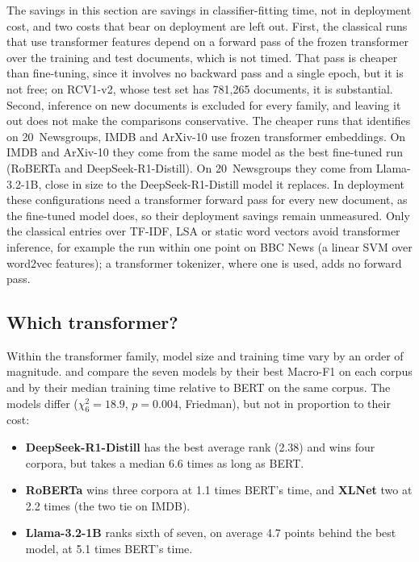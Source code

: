 \documentclass{ijis}
\begin{document}
The savings in this section are savings in classifier-fitting time, not in deployment cost, and two costs that bear on deployment are left out. First, the classical runs that use transformer features depend on a forward pass of the frozen transformer over the training and test documents, which is not timed. That pass is cheaper than fine-tuning, since it involves no backward pass and a single epoch, but it is not free; on RCV1-v2, whose test set has 781,265 documents, it is substantial. Second, inference on new documents is excluded for every family, and leaving it out does not make the comparisons conservative. The cheaper runs that  identifies on 20~Newsgroups, IMDB and ArXiv-10 use frozen transformer embeddings. On IMDB and ArXiv-10 they come from the same model as the best fine-tuned run (RoBERTa and DeepSeek-R1-Distill). On 20~Newsgroups they come from Llama-3.2-1B, close in size to the DeepSeek-R1-Distill model it replaces. In deployment these configurations need a transformer forward pass for every new document, as the fine-tuned model does, so their deployment savings remain unmeasured. Only the classical entries over TF-IDF, LSA or static word vectors avoid transformer inference, for example the run within one point on BBC News (a linear SVM over word2vec features); a transformer tokenizer, where one is used, adds no forward pass.

\subsection{Which transformer?}\label{sec:lms}

Within the transformer family, model size and training time vary by an order of magnitude.  and  compare the seven models by their best Macro-F1 on each corpus and by their median training time relative to BERT on the same corpus. The models differ ($\chi^2_6 = 18.9$, $p = 0.004$, Friedman), but not in proportion to their cost:
\begin{itemize}
\setlength\itemsep{1pt}
\item \textbf{DeepSeek-R1-Distill} has the best average rank (2.38) and wins four corpora, but takes a median 6.6 times as long as BERT.
\item \textbf{RoBERTa} wins three corpora at 1.1 times BERT's time, and \textbf{XLNet} two at 2.2 times (the two tie on IMDB).
\item \textbf{Llama-3.2-1B} ranks sixth of seven, on average 4.7 points behind the best model, at 5.1 times BERT's time.
\end{itemize}
\end{document}
